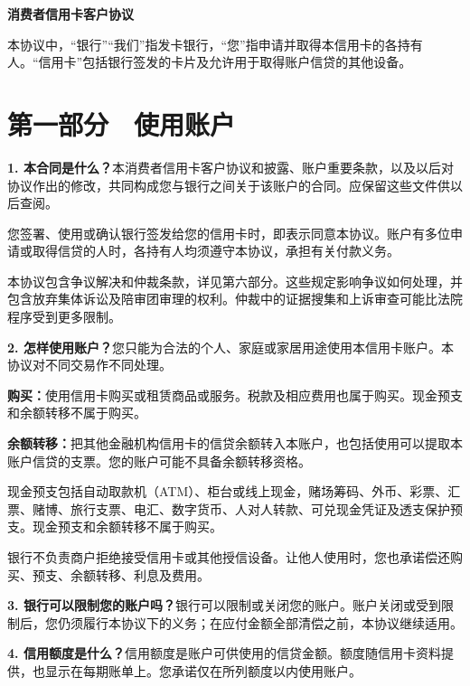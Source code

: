 \documentclass[UTF8,fontset=none,11pt,a4paper]{ctexart}
\begin{document}
{\noindent\fontsize{20}{25}\selectfont\bfseries 消费者信用卡客户协议\par}
\vspace{10pt}
本协议中，“银行”“我们”指发卡银行，“您”指申请并取得本信用卡的各持有人。“信用卡”包括银行签发的卡片及允许用于取得账户信贷的\allowbreak\mbox{其他设备。}


\section*{第一部分　使用账户}
\textbf{1. 本合同是什么？}本消费者信用卡客户协议和披露、账户重要条款，以及以后对协议作出的修改，共同构成您与银行之间关于该账户的合同。应保留这些文件供\allowbreak\mbox{以后查阅。}


您签署、使用或确认银行签发给您的信用卡时，即表示同意本协议。账户有多位申请或取得信贷的人时，各持有人均须遵守本协议，承担有关\allowbreak\mbox{付款义务。}


本协议包含争议解决和仲裁条款，详见第六部分。这些规定影响争议如何处理，并包含放弃集体诉讼及陪审团审理的权利。仲裁中的证据搜集和上诉审查可能比法院程序受到\allowbreak\mbox{更多限制。}


\textbf{2. 怎样使用账户？}您只能为合法的个人、家庭或家居用途使用本信用卡账户。本协议对不同交易作\allowbreak\mbox{不同处理。}


\textbf{购买：}使用信用卡购买或租赁商品或服务。税款及相应费用也属于购买。现金预支和余额转移不\allowbreak\mbox{属于购买。}


\textbf{余额转移：}把其他金融机构信用卡的信贷余额转入本账户，也包括使用可以提取本账户信贷的支票。您的账户可能不具备余额\allowbreak\mbox{转移资格。}


现金预支包括自动取款机（ATM）、柜台或线上现金，赌场筹码、外币、彩票、汇票、赌博、旅行支票、电汇、数字货币、人对人转款、可兑现金凭证及透支保护预支。现金预支和余额转移不属\allowbreak\mbox{于购买。}


银行不负责商户拒绝接受信用卡或其他授信设备。让他人使用时，您也承诺偿还购买、预支、余额转移、利\allowbreak\mbox{息及费用。}


\textbf{3. 银行可以限制您的账户吗？}银行可以限制或关闭您的账户。账户关闭或受到限制后，您仍须履行本协议下的义务；在应付金额全部清偿之前，本协议\allowbreak\mbox{继续适用。}


\textbf{4. 信用额度是什么？}信用额度是账户可供使用的信贷金额。额度随信用卡资料提供，也显示在每期账单上。您承诺仅在所列额度以内\allowbreak\mbox{使用账户。}
\end{document}
